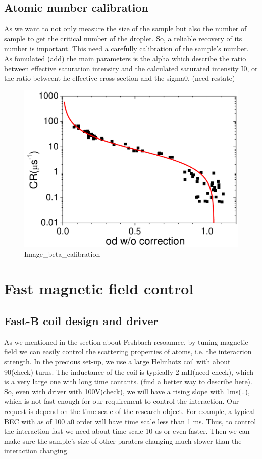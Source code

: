 \subsection{Atomic number calibration}

As we want to not only measure the size of the sample but also the number of sample to get the critical number of the droplet. So, a reliable recovery of its number is important. This need a carefully calibration of the sample's number. As fomulated (add) the main parameters is the alpha which describe the ratio between effective saturation intensity and the calculated saturated intensity I0, or the ratio betweent he effective cross section and the sigma0. (need restate) 

\begin{figure}[hb]
\begin{center}
\includegraphics[width = 0.8\linewidth]{figures/Image_beta_calibration.pdf}
\end{center}
\caption{Image_beta_calibration}
\label{Image_beta_calibration}
\end{figure}





\section{Fast magnetic field control}
\subsection{Fast-B coil design and driver}
As we mentioned in the section about Feshbach resoannce, by tuning magnetic field we can easily control the scattering properties of atoms, i.e. the interacrion strength. In the precious set-up, we use a large Helmhotz coil with about 90(check) turns. The inductance of the coil is typically 2 mH(need check), which is a very large one with long time contants. (find a better way to describe here). So, even with driver with 100V(check), we will have a rising slope with 1ms(..), which is not fast enough for our requirement to control the interaction. Our request is depend on the time scale of the research object. For example, a typical BEC with as of 100 a0 order will have time scale less than 1 ms. Thus, to control the interaction fast we need about time scale 10 us or even faster. Then we can make sure the sample's size of other paraters changing much slower than the interaction changing.

